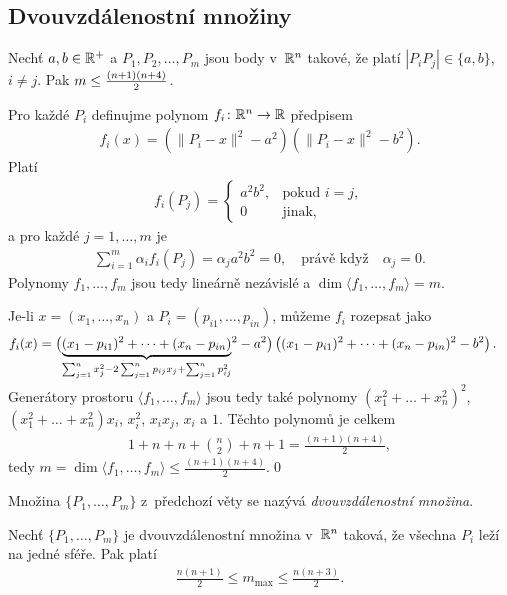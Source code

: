 \subsection{Dvouvzdálenostní množiny}


\vt Nechť $a,b\in\mathbb{R}^+$ a $P_1, P_2, \dots, P_m$ jsou body v~$\mathbb{R}^n$ takové, že platí $|P_iP_j| \in\{a,b\}$, $i\neq j$. Pak $m \leq {(n+1)(n+4)\over 2}$.

\dk Pro každé $P_i$ definujme polynom $f_i\colon\mathbb{R}^n\rightarrow\mathbb{R}$ předpisem
\begin{align}
f_i(x) = (\|P_i-x\|^2-a^2)(\|P_i-x\|^2-b^2).
\end{align}
Platí
\begin{align}
f_i(P_j)=\begin{cases}a^2b^2,&\text{pokud }i=j,\\0&\text{jinak,}\end{cases}
\end{align}
a pro každé $j=1,\dots,m$ je
\begin{align}
\sum_{i=1}^m\alpha_if_i(P_j)=\alpha_ja^2b^2=0,\quad\text{právě když}\quad\alpha_j=0.
\end{align}
Polynomy $f_1,\dots,f_m$ jsou tedy lineárně nezávislé a $\dim \langle f_1,\dots,f_m\rangle=m$.

Je-li $x=(x_1,\dots,x_n)$ a $P_i=(p_{i1},\dots,p_{in})$, můžeme $f_i$ rozepsat jako
\begin{align}
f_i(x)&= \left(\smash{\underbrace{(x_1-p_{i1})^2+\dots+(x_n-p_{in})}_{\sum_{j=1}^nx_j^2-2\sum_{j=1}^np_{ij}x_j+\sum_{j=1}^np_{ij}^2}}^2-a^2\right)\left((x_1-p_{i1})^2+\dots+(x_n-p_{in})^2-b^2\right)\vphantom{\underbrace{x}_{\sum_{i=1}^n}}.
\end{align}
Generátory prostoru $\langle f_1,\dots,f_m\rangle$ jsou tedy také polynomy $(x_1^2+\dots+x_n^2)^2$, $(x_1^2+\dots+x_n^2)x_i$, $x_i^2$, $x_ix_j$, $x_i$ a $1$. Těchto polynomů je celkem
\begin{align}
1+n+n+{n\choose2}+n+1=\frac{(n+1)(n+4)}2,
\end{align}
tedy $m=\dim\langle f_1,\dots,f_m\rangle\leq\frac{(n+1)(n+4)}2$.\qed

\smallskip
Množina $\{P_1,\dots,P_m\}$ z~předchozí věty se nazývá {\it dvouvzdálenostní množina}.

\vt Nechť $\{P_1,\dots,P_m\}$ je dvouvzdálenostní množina v~$\mathbb{R}^n$ taková, že všechna $P_i$ leží na jedné sféře. Pak platí
\begin{align}
\frac{n(n+1)}2 \leq m_{\max} \leq \frac{n(n+3)}2.
\end{align}

